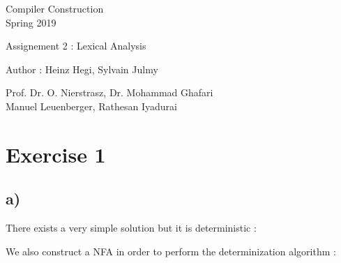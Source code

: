 \documentclass[a4paper,11pt]{report}
\author{Heinz Hegi, Sylvain Julmy}
\date{\today}
\begin{document}
\begin{center}
  \Large{
    Compiler Construction \\
    Spring 2019
  }
  
  \noindent\makebox[\linewidth]{\rule{\linewidth}{0.4pt}}
  Assignement 2 : Lexical Analysis

  \vspace*{1.4cm}

  Author : Heinz Hegi, Sylvain Julmy
  \noindent\makebox[\linewidth]{\rule{\linewidth}{0.4pt}}

  {\small
  \begin{flushright}
    Prof. Dr. O. Nierstrasz, Dr. Mohammad Ghafari \\
    Manuel Leuenberger, Rathesan Iyadurai
  \end{flushright}}

  \noindent\makebox[\linewidth]{\rule{\textwidth}{1pt}}
\end{center}

\section*{Exercise 1}

\subsection*{a)}

There exists a very simple solution but it is deterministic :

\begin{center}
\end{center}

We also construct a NFA in order to perform the determinization algorithm :
\end{document}
